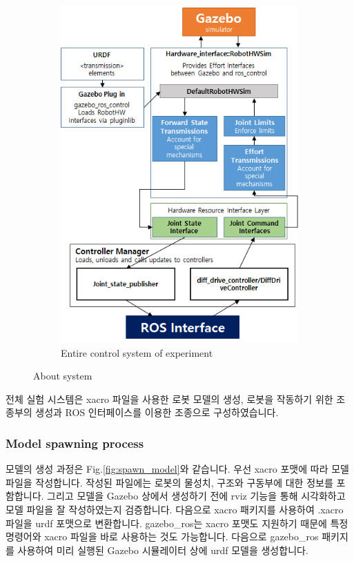 \documentclass{article}
\begin{document}
\begin{figure}[b!]
\begin{subfigure}[b]{0.5\textwidth}
			\includegraphics[width=\textwidth]{figures/control_system.png}
			\caption{\label{fig:control_system}Entire control system of experiment}
			\end{subfigure}
			\caption{About system}
		\end{figure}
		
		전체 실험 시스템은 xacro 파일을 사용한 로봇 모델의 생성, 로봇을 작동하기 위한 조종부의 생성과 ROS 인터페이스를 이용한 조종으로 구성하였습니다.
		
			\subsubsection{Model spawning process}
			모델의 생성 과정은 Fig.\ref{fig:spawn_model}와 같습니다. 우선 xacro 포맷에 따라 모델 파일을 작성합니다. 작성된 파일에는 로봇의 물성치, 구조와 구동부에 대한 정보를 포함합니다. 그리고 모델을 Gazebo 상에서 생성하기 전에 rviz 기능을 통해 시각화하고 모델 파일을 잘 작성하였는지 검증합니다. 다음으로 xacro 패키지를 사용하여 .xacro 파일을 urdf 포맷으로 변환합니다. gazebo\_ros는 xacro 포맷도 지원하기 때문에 특정 명령어와 xacro 파일을 바로 사용하는 것도 가능합니다. 다음으로 gazebo\_ros 패키지를 사용하여 미리 실행된 Gazebo 시뮬레이터 상에 urdf 모델을 생성합니다.
			
\end{document}
